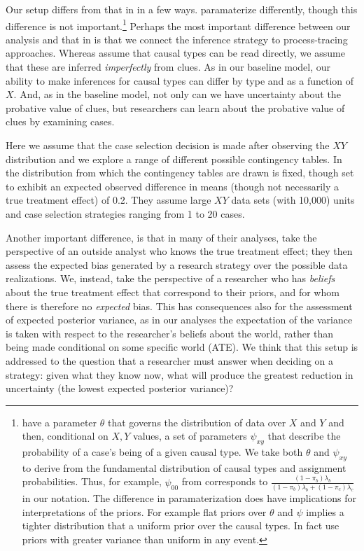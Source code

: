 \documentclass[12pt,]{book}
\let\rmarkdownfootnote\footnote%
\def\footnote{\protect\rmarkdownfootnote}
\begin{document}
Our setup differs from that in \citet{HerronQuinn} in a few ways. \citet{HerronQuinn} paramaterize differently, though this difference is not important.\footnote{\citet{HerronQuinn} have a parameter \(\theta\) that governs the distribution of data over \(X\) and \(Y\) and then, conditional on \(X,Y\) values, a set of parameters \(\psi_{xy}\) that describe the probability of a case's being of a given causal type. We take both \(\theta\) and \(\psi_{xy}\) to derive from the fundamental distribution of causal types and assignment probabilities. Thus, for example, \(\psi_{00}\) from \citet{HerronQuinn} corresponds to \(\frac{(1-\pi_b)\lambda_b}{(1-\pi_b)\lambda_b + (1-\pi_c)\lambda_c}\) in our notation. The difference in paramaterization does have implications for interpretations of the priors. For example flat priors over \(\theta\) and \(\psi\) implies a tighter distribution that a uniform prior over the causal types. In fact \citet{HerronQuinn} use priors with greater variance than uniform in any event.} Perhaps the most important difference between our analysis and that in \citet{HerronQuinn} is that we connect the inference strategy to process-tracing approaches. Whereas \citet{HerronQuinn} assume that causal types can be read directly, we assume that these are inferred \emph{imperfectly} from clues. As in our baseline model, our ability to make inferences for causal types can differ by type and as a function of \(X\). And, as in the baseline model, not only can we have uncertainty about the probative value of clues, but researchers can learn about the probative value of clues by examining cases.

Here we assume that the case selection decision is made after observing the \(XY\) distribution and we explore a range of different possible contingency tables. In \citet{HerronQuinn} the distribution from which the contingency tables are drawn is fixed, though set to exhibit an expected observed difference in means (though not necessarily a true treatment effect) of 0.2. They assume large \(XY\) data sets (with 10,000) units and case selection strategies ranging from 1 to 20 cases.

Another important difference, is that in many of their analyses, \citet{HerronQuinn} take the perspective of an outside analyst who knows the true treatment effect; they then assess the expected bias generated by a research strategy over the possible data realizations. We, instead, take the perspective of a researcher who has \emph{beliefs} about the true treatment effect that correspond to their priors, and for whom there is therefore no \emph{expected} bias. This has consequences also for the assessment of expected posterior variance, as in our analyses the expectation of the variance is taken with respect to the researcher's beliefs about the world, rather than being made conditional on some specific world (ATE). We think that this setup is addressed to the question that a researcher must answer when deciding on a strategy: given what they know now, what will produce the greatest reduction in uncertainty (the lowest expected posterior variance)?
\end{document}
